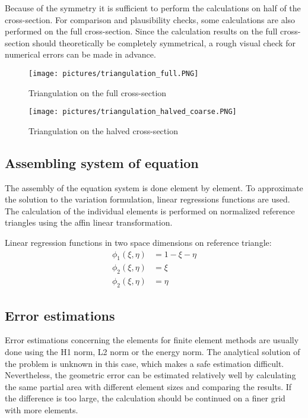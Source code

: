 \documentclass[parskip=half, titlepage=yes, 12pt, BCOR=12mm, DIV=calc]{scrartcl}
\begin{document}
Because of the symmetry it is sufficient to perform the calculations on half of the cross-section. For comparison and plausibility checks, some calculations are also performed on the full cross-section. Since the calculation results on the full cross-section should theoretically be completely symmetrical, a rough visual check for numerical errors can be made in advance.


\begin{figure}[H]
    \centering
    \texttt{[image: pictures/triangulation\_full.PNG]}
    \caption{Triangulation on the full cross-section}
    \label{fig:triangulation_full}
\end{figure}

\begin{figure}[H]
    \centering
    \texttt{[image: pictures/triangulation\_halved\_coarse.PNG]}
    \caption{Triangulation on the halved cross-section}
    \label{fig:triangulation_halved}
\end{figure}


\subsection{Assembling system of equation}

The assembly of the equation system is done element by element. To approximate the solution to the variation formulation, linear regressions functions are used. The calculation of the individual elements is performed on normalized reference triangles using the affin linear transformation.

Linear regression functions in two space dimensions on reference triangle:
\begin{align}
    \phi_1(\xi, \eta) &= 1 - \xi - \eta \\
    \phi_2(\xi, \eta) &= \xi \\
    \phi_2(\xi, \eta) &= \eta 
\end{align}


\subsection{Error estimations}

Error estimations concerning the elements for finite element methods are usually done using the H1 norm, L2 norm or the energy norm. The analytical solution of the problem is unknown in this case, which makes a safe estimation difficult. Nevertheless, the geometric error can be estimated relatively well by calculating the same partial area with different element sizes and comparing the results. If the difference is too large, the calculation should be continued on a finer grid with more elements. 
\end{document}
